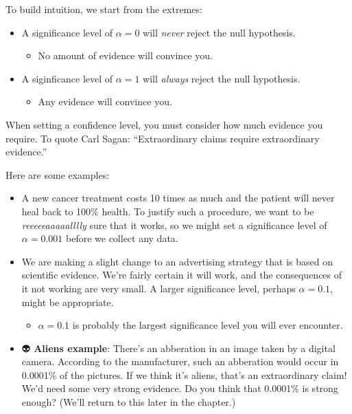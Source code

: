 \documentclass[
  letterpaper,
  DIV=11,
  numbers=noendperiod]{scrreprt}
\providecommand{\tightlist}{%
  \setlength{\itemsep}{0pt}\setlength{\parskip}{0pt}}\usepackage{longtable,booktabs,array}
\begin{document}
To build intuition, we start from the extremes:

\begin{itemize}
\tightlist
\item
  A significance level of \(\alpha = 0\) will \emph{never} reject the
  null hypothesis.

  \begin{itemize}
  \tightlist
  \item
    No amount of evidence will convince you.
  \end{itemize}
\item
  A siginficance level of \(\alpha = 1\) will \emph{always} reject the
  null hypothesis.

  \begin{itemize}
  \tightlist
  \item
    Any evidence will convince you.
  \end{itemize}
\end{itemize}

When setting a confidence level, you must consider how much evidence you
require. To quote Carl Sagan: ``Extraordinary claims require
extraordinary evidence.''

Here are some examples:

\begin{itemize}
\tightlist
\item
  A new cancer treatment costs 10 times as much and the patient will
  never heal back to 100\% health. To justify such a procedure, we want
  to be \emph{reeeeeaaaaalllly} sure that it works, so we might set a
  significance level of \(\alpha=0.001\) before we collect any data.
\item
  We are making a slight change to an advertising strategy that is based
  on scientific evidence. We're fairly certain it will work, and the
  consequences of it not working are very small. A larger significance
  level, perhaps \(\alpha = 0.1\), might be appropriate.

  \begin{itemize}
  \tightlist
  \item
    \(\alpha = 0.1\) is probably the largest significance level you will
    ever encounter.
  \end{itemize}
\item
  👽 \textbf{Aliens example}: There's an abberation in an image taken by
  a digital camera. According to the manufacturer, such an abberation
  would occur in 0.0001\% of the pictures. If we think it's aliens,
  that's an extraordinary claim! We'd need some very strong evidence. Do
  you think that 0.0001\% is strong enough? (We'll return to this later
  in the chapter.)
\end{itemize}
\end{document}

